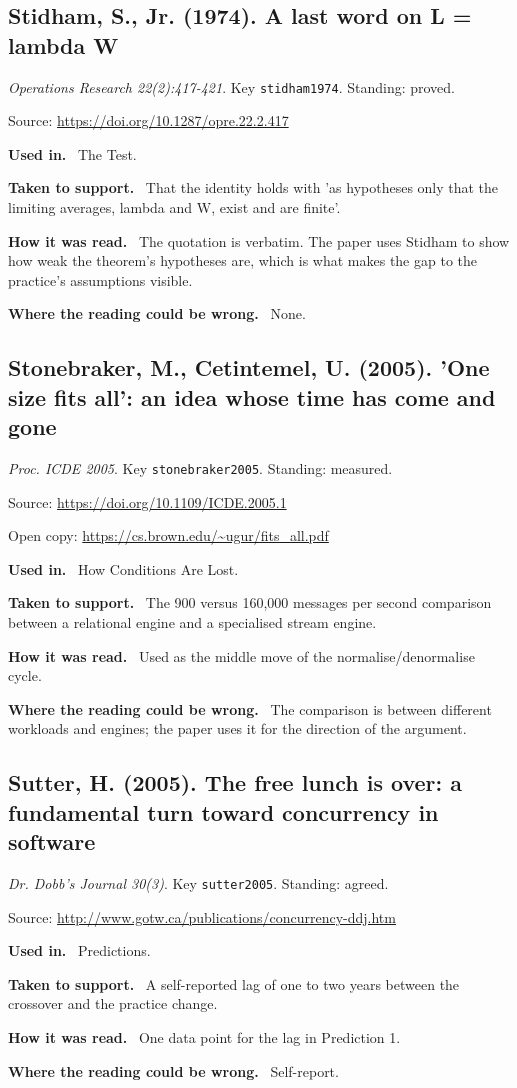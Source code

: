 \documentclass[11pt,oneside]{article}
\newcommand{\field}[1]{\par\noindent\textbf{\color{accent}#1.}\ }
\begin{document}
\hypertarget{src:stidham1974}{}
\subsection*{Stidham, S., Jr. (1974). A last word on L = lambda W}
\noindent\small\emph{Operations Research 22(2):417-421}. Key \texttt{stidham1974}. Standing: proved.
\par\noindent\small Source: \url{https://doi.org/10.1287/opre.22.2.417}
\normalsize
\field{Used in} The Test.
\field{Taken to support} That the identity holds with 'as hypotheses only that the limiting averages, lambda and W, exist and are finite'.
\field{How it was read} The quotation is verbatim. The paper uses Stidham to show how weak the theorem's hypotheses are, which is what makes the gap to the practice's assumptions visible.
\field{Where the reading could be wrong} None.

\hypertarget{src:stonebraker2005}{}
\subsection*{Stonebraker, M., Cetintemel, U. (2005). 'One size fits all': an idea whose time has come and gone}
\noindent\small\emph{Proc. ICDE 2005}. Key \texttt{stonebraker2005}. Standing: measured.
\par\noindent\small Source: \url{https://doi.org/10.1109/ICDE.2005.1}
\par\noindent\small Open copy: \url{https://cs.brown.edu/~ugur/fits_all.pdf}
\normalsize
\field{Used in} How Conditions Are Lost.
\field{Taken to support} The 900 versus 160,000 messages per second comparison between a relational engine and a specialised stream engine.
\field{How it was read} Used as the middle move of the normalise/denormalise cycle.
\field{Where the reading could be wrong} The comparison is between different workloads and engines; the paper uses it for the direction of the argument.

\hypertarget{src:sutter2005}{}
\subsection*{Sutter, H. (2005). The free lunch is over: a fundamental turn toward concurrency in software}
\noindent\small\emph{Dr. Dobb's Journal 30(3)}. Key \texttt{sutter2005}. Standing: agreed.
\par\noindent\small Source: \url{http://www.gotw.ca/publications/concurrency-ddj.htm}
\normalsize
\field{Used in} Predictions.
\field{Taken to support} A self-reported lag of one to two years between the crossover and the practice change.
\field{How it was read} One data point for the lag in Prediction 1.
\field{Where the reading could be wrong} Self-report.
\end{document}

